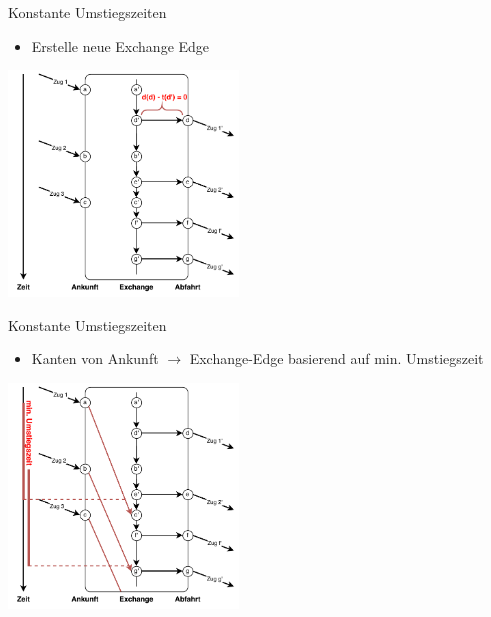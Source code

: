\begin{frame}{Konstante Umstiegszeiten}
	\begin{itemize}
		\item Erstelle neue Exchange Edge
	\end{itemize}

	\begin{center}
		\includegraphics[height=6cm]{images/time_expanded_constant_interchange_1.pdf} 
	\end{center}
\end{frame}


\begin{frame}{Konstante Umstiegszeiten}
	\begin{itemize}
		\item Kanten von Ankunft $\rightarrow$ Exchange-Edge basierend auf min. Umstiegszeit
	\end{itemize}

	\begin{center}
		\includegraphics[height=6cm]{images/time_expanded_constant_interchange_2.pdf} 
	\end{center}
\end{frame}


